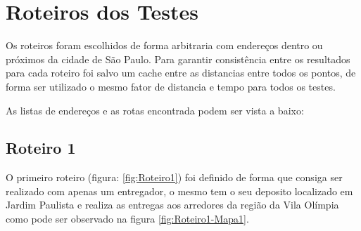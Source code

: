 \pagebreak
\section{Roteiros dos Testes}
Os roteiros foram escolhidos de forma arbitraria com endereços dentro ou próximos da cidade de São Paulo. Para garantir consistência entre os resultados para cada roteiro foi salvo um cache entre as distancias entre todos os pontos, de forma  ser utilizado o mesmo fator de distancia e tempo para todos os testes.

As listas de endereços e as rotas encontrada podem ser vista a baixo:

\subsection{Roteiro 1}

O primeiro roteiro (figura: \ref{fig:Roteiro1}) foi definido de forma que consiga ser realizado com apenas um entregador, o mesmo tem o seu deposito localizado em Jardim Paulista e realiza as entregas aos arredores da região da Vila Olímpia como pode ser observado na figura \ref{fig:Roteiro1-Mapa1}.
 
\begin{center}
	\label{fig:Roteiro1}
\end{center}

\begin{center}
	\label{fig:Roteiro1-Mapa1}
\end{center}



